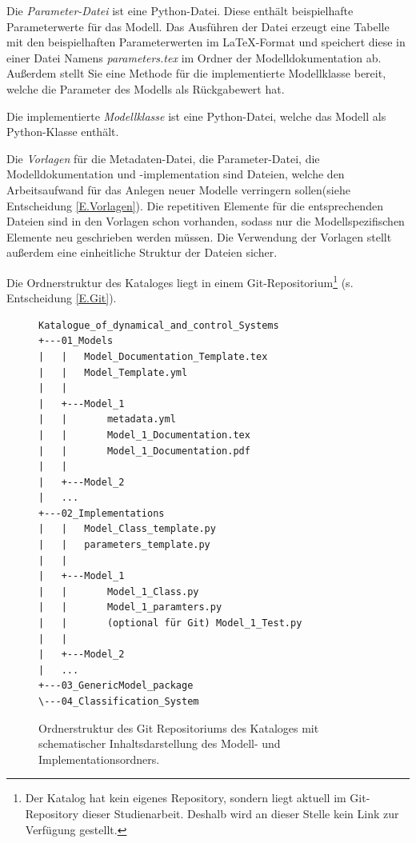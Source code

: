Die \textit{Parameter-Datei} ist eine Python-Datei. Diese enthält beispielhafte Parameterwerte für das Modell. Das Ausführen der Datei erzeugt eine Tabelle mit den beispielhaften Parameterwerten im \LaTeX-Format und speichert diese in einer Datei Namens \textit{parameters.tex} im Ordner der Modelldokumentation ab. Außerdem stellt Sie eine Methode für die implementierte Modellklasse bereit, welche die Parameter des Modells als Rückgabewert hat.

Die implementierte \textit{Modellklasse} ist eine Python-Datei, welche das Modell als Python-Klasse enthält. 

Die \textit{Vorlagen} für die Metadaten-Datei, die Parameter-Datei, die Modelldokumentation und -implementation sind Dateien, welche den Arbeitsaufwand für das Anlegen neuer Modelle verringern sollen(siehe Entscheidung \ref{E.Vorlagen}). Die repetitiven Elemente für die entsprechenden Dateien sind in den Vorlagen schon vorhanden, sodass nur die Modellspezifischen Elemente neu geschrieben werden müssen. Die Verwendung der Vorlagen stellt außerdem eine einheitliche Struktur der Dateien sicher.

Die Ordnerstruktur des Kataloges liegt in einem Git-Repositorium\footnote{Der Katalog hat kein eigenes Repository, sondern liegt aktuell im Git-Repository dieser Studienarbeit. Deshalb wird an dieser Stelle kein Link zur Verfügung gestellt.} (s. Entscheidung \ref{E.Git}).  

\begin{figure}[H]
	\centering
	\begin{adjustbox}{padding=15pt 0pt 0pt 0pt, fbox}
		\begin{lstlisting}[basicstyle=\footnotesize, extendedchars=false]
Katalogue_of_dynamical_and_control_Systems
+---01_Models
|   |   Model_Documentation_Template.tex
|   |   Model_Template.yml 
|   |
|   +---Model_1
|   |       metadata.yml
|   |       Model_1_Documentation.tex
|   |       Model_1_Documentation.pdf	
|   |
|   +---Model_2
|   ...
+---02_Implementations
|   |   Model_Class_template.py
|   |   parameters_template.py
|   |             
|   +---Model_1
|   |       Model_1_Class.py
|   |       Model_1_paramters.py
|   |       (optional für Git) Model_1_Test.py
|   |
|   +---Model_2
|   ...
+---03_GenericModel_package
\---04_Classification_System

		\end{lstlisting}
	\end{adjustbox}
	\caption[Ordnerstruktur des Kataloges]{Ordnerstruktur des Git Repositoriums des Kataloges mit schematischer Inhaltsdarstellung des Modell- und Implementationsordners.}
	\label{fig:Ordnerstruktur}
\end{figure}

